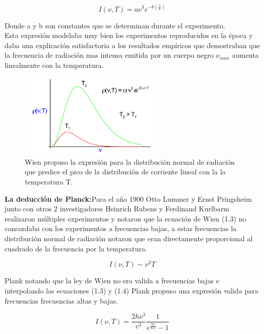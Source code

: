 \begin{equation}
    I(\nu,T)= a \nu^{3} e^{-b(\frac{\nu}{T})}
\end{equation}{}


\noindent Donde a y b son constantes que se determinan durante el experimento.\\
Esta expresión modelaba muy bien los experimentos  reproducidos en la época y daba una explicación satisfactoria a los resultados empíricos que demostraban que la frecuencia de radiación mas intensa emitida por un cuerpo negro $\nu_{max}$ aumenta linealmente con la temperatura.

\begin{figure}[htb!]
\centering
\includegraphics[width=0.6\textwidth]{images/5.png}
\caption[Descripción versión comprimida]{Wien propuso la expresión para la distribución normal de radiación que predice el pico de la distribución de corriente lineal con la la temperatura T.\cite{plank}}
 \label{fig1}
\end{figure}

\noindent \textbf{La deducción de Planck:}Para el año 1900 Otto Lummer y Ernst Pringsheim junto con otros 2 investigadores Heinrich Rubens y Ferdinand Kurlbarm realizaron múltiples experimentos y notaron que la ecuación de Wien (1.3) no concordaba con los experimentos a frecuencias bajas, a estas frecuencias la distribución normal de radiación notaron que eran directamente proporcional al cuadrado de la frecuencia por la temperatura.

\begin{equation}
    I(\nu,T) \sim \nu^{2} T
\end{equation}{}

\noindent Plank notando que la ley de Wien no era valida a frecuencias bajas e interpolando las ecuaciones (1.3) y (1.4) Plank propuso una expresión valida para frecuencias frecuencias altas y bajas.

\begin{equation}
    I(\nu,T)= \frac{2 h \nu^3}{c^3}\frac{1}{e^\frac{h\nu}{KT}-1}  
\end{equation}{}


